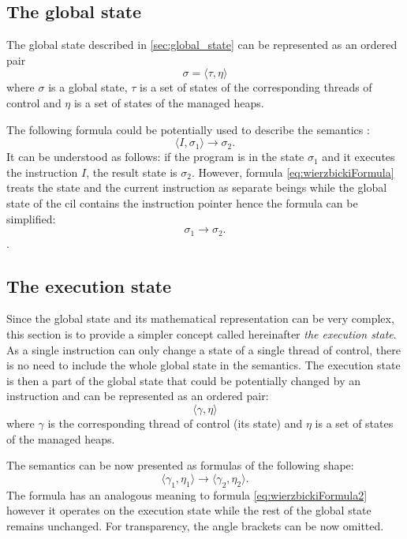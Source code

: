 \documentclass{article}
\numberwithin{equation}{section}
\begin{document}
\subsection{The global state}

The global state described in \ref{sec:global_state} can be represented as an ordered pair
\begin{equation}
	\sigma = \langle\tau, \eta\rangle
\end{equation}
where $\sigma$ is a global state, $\tau$ is a set of states of the corresponding threads of control and $\eta$ is a set of states of the managed heaps.

The following formula could be potentially used to describe the semantics \cite{wierzbicki}:
\begin{equation}
\label{eq:wierzbickiFormula}
	\langle I, \sigma_1\rangle \rightarrow \sigma_2.
\end{equation}
It can be understood as follows: if the program is in the state $\sigma_1$ and it executes the instruction $I$, the result state is $\sigma_2$. However, formula \ref{eq:wierzbickiFormula} treats the state and the current instruction as separate beings while the global state of the \acrshort{cil} contains the instruction pointer hence the formula can be simplified:
\begin{equation}
\label{eq:wierzbickiFormula2}
	\sigma_1 \rightarrow \sigma_2.
\end{equation}.

\subsection{The execution state}
\label{sec:executionState}

Since the global state and its mathematical representation can be very complex, this section is to provide a simpler concept called hereinafter \textit{the execution state}. As a single instruction can only change a state of a single thread of control, there is no need to include the whole global state in the semantics. The execution state is then a part of the global state that could be potentially changed by an instruction and can be represented as an ordered pair:
\begin{equation}
\label{eq:executionState}
	\langle\gamma, \eta\rangle
\end{equation}
where $\gamma$ is the corresponding thread of control (its state) and $\eta$ is a set of states of the managed heaps.

The semantics can be now presented as formulas of the following shape:
\begin{equation}
\label{eq:simpleSemantics}
	\langle\gamma_1, \eta_1\rangle \rightarrow \langle\gamma_2, \eta_2\rangle.
\end{equation}
The formula has an analogous meaning to formula \ref{eq:wierzbickiFormula2} however it operates on the execution state while the rest of the global state remains unchanged. For transparency, the angle brackets can be now omitted.
\end{document}
